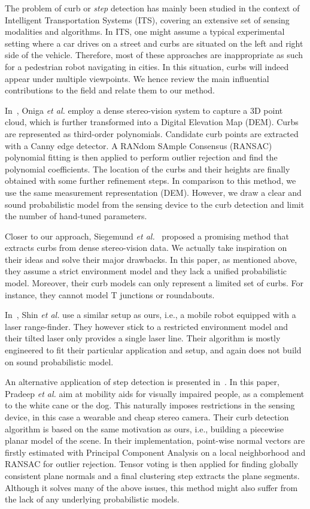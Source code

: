 The problem of curb or \emph{step} detection has mainly been studied in the
context of Intelligent Transportation Systems (ITS), covering an extensive set
of sensing modalities and algorithms. In ITS, one might assume a typical
experimental setting where a car drives on a street and curbs are situated on
the left and right side of the vehicle. Therefore, most of these approaches
are inappropriate as such for a pedestrian robot navigating in cities. In this
situation, curbs will indeed appear under multiple viewpoints. We hence review
the main influential contributions to the field and relate them to our method.

In~\cite{oniga10polynomial}, Oniga \emph{et al.} employ a dense stereo-vision
system to capture a 3D point cloud, which is further transformed into a Digital
Elevation Map (DEM). Curbs are represented as third-order polynomials. Candidate
curb points are extracted with a Canny edge detector. A RANdom SAmple Consensus
(RANSAC) polynomial fitting is then applied to perform outlier rejection and
find the polynomial coefficients. The location of the curbs and their heights
are finally obtained with some further refinement steps. In comparison to this
method, we use the same measurement representation (DEM). However, we draw a
clear and sound probabilistic model from the sensing device to the curb
detection and limit the number of hand-tuned parameters.

Closer to our approach, Siegemund \emph{et al.}~\cite{siegemund10curb} proposed
a promising method that extracts curbs from dense stereo-vision data. We
actually take inspiration on their ideas and solve their major drawbacks. In
this paper, as mentioned above, they assume a strict environment model and they
lack a unified probabilistic model. Moreover, their curb models can only
represent a limited set of curbs. For instance, they cannot model T
junctions or roundabouts.

In~\cite{shin10drivable}, Shin \emph{et al.} use a similar setup as ours, i.e.,
a mobile robot equipped with a laser range-finder. They however stick to a
restricted environment model and their tilted laser only provides a single laser
line. Their algorithm is mostly engineered to fit their particular application
and setup, and again does not build on sound probabilistic model.

An alternative application of step detection is presented
in~\cite{pradeep08piece}. In this paper, Pradeep \emph{et al.} aim at mobility
aids for visually impaired people, as a complement to the white cane or the dog.
This naturally imposes restrictions in the sensing device, in this case a
wearable and cheap stereo camera. Their curb detection algorithm is based on the
same motivation as ours, i.e., building a piecewise planar model of the scene.
In their implementation, point-wise normal vectors are firstly estimated with
Principal Component Analysis on a local neighborhood and RANSAC for outlier
rejection. Tensor voting is then applied for finding globally consistent plane
normals and a final clustering step extracts the plane segments. Although it
solves many of the above issues, this method might also suffer from the lack of
any underlying probabilistic models.

